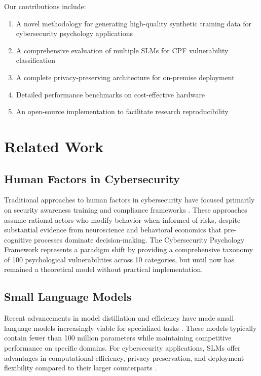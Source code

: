 \documentclass[11pt,a4paper]{article}
\begin{document}
Our contributions include:
\begin{enumerate}
    \item A novel methodology for generating high-quality synthetic training data for cybersecurity psychology applications
    \item A comprehensive evaluation of multiple SLMs for CPF vulnerability classification
    \item A complete privacy-preserving architecture for on-premise deployment
    \item Detailed performance benchmarks on cost-effective hardware
    \item An open-source implementation to facilitate research reproducibility
\end{enumerate}

\section{Related Work}

\subsection{Human Factors in Cybersecurity}
Traditional approaches to human factors in cybersecurity have focused primarily on security awareness training and compliance frameworks \cite{sans2023}. These approaches assume rational actors who modify behavior when informed of risks, despite substantial evidence from neuroscience \cite{libet1983, soon2008} and behavioral economics \cite{kahneman2011} that pre-cognitive processes dominate decision-making. The Cybersecurity Psychology Framework \cite{canale2025cpf} represents a paradigm shift by providing a comprehensive taxonomy of 100 psychological vulnerabilities across 10 categories, but until now has remained a theoretical model without practical implementation.

\subsection{Small Language Models}
Recent advancements in model distillation and efficiency have made small language models increasingly viable for specialized tasks \cite{sanh2019distilbert, turc2019}. These models typically contain fewer than 100 million parameters while maintaining competitive performance on specific domains. For cybersecurity applications, SLMs offer advantages in computational efficiency, privacy preservation, and deployment flexibility compared to their larger counterparts \cite{zaheer2020}.
\end{document}
